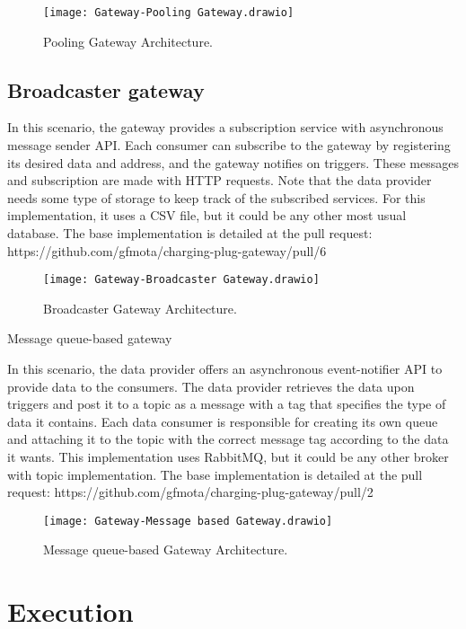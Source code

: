 \begin{figure}
    \centering
    \texttt{[image: Gateway-Pooling Gateway.drawio]}
    \caption{Pooling Gateway Architecture.\label{fig:subfigures3}}
\end{figure}

\subsection*{Broadcaster gateway}
\label{sec:broadcaster}

In this scenario, the gateway provides a subscription service with asynchronous message sender API. Each consumer can subscribe to the gateway by registering its desired data and address, and the gateway notifies on triggers. These messages and subscription are made with HTTP requests. Note that the data provider needs some type of storage to keep track of the subscribed services. For this implementation, it uses a CSV file, but it could be any other most usual database. The base implementation is detailed at the pull request: https://github.com/gfmota/charging-plug-gateway/pull/6

\begin{figure}
    \centering
    \texttt{[image: Gateway-Broadcaster Gateway.drawio]}
    \caption{Broadcaster Gateway Architecture.\label{fig:subfigures4}}
\end{figure}

{Message queue-based gateway}
\label{sec:messagequeue}

In this scenario, the data provider offers an asynchronous event-notifier API to provide data to the consumers. The data provider retrieves the data upon triggers and post it to a topic as a message with a tag that specifies the type of data it contains. Each data consumer is responsible for creating its own queue and attaching it to the topic with the correct message tag according to the data it wants. This implementation uses RabbitMQ, but it could be any other broker with topic implementation. The base implementation is detailed at the pull request: https://github.com/gfmota/charging-plug-gateway/pull/2

\begin{figure}
    \centering
    \texttt{[image: Gateway-Message based Gateway.drawio]}
    \caption{Message queue-based Gateway Architecture.\label{fig:subfigures5}}
\end{figure}

\section{Execution}
\label{sec:execution}


